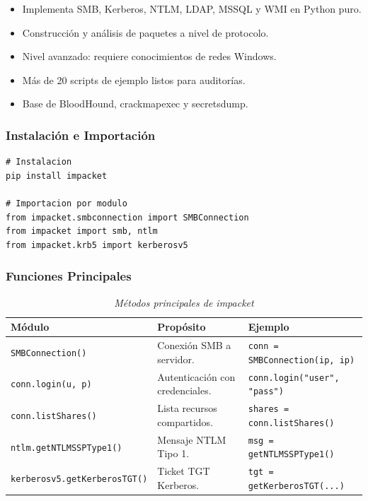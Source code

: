\documentclass[12pt,a4paper]{article}
\begin{document}
\begin{itemize}
\item Implementa SMB, Kerberos, NTLM, LDAP, MSSQL y WMI en Python puro.
\item Construcción y análisis de paquetes a nivel de protocolo.
\item Nivel avanzado: requiere conocimientos de redes Windows.
\item Más de 20 scripts de ejemplo listos para auditorías.
\item Base de BloodHound, crackmapexec y secretsdump.
\end{itemize}

\subsubsection{Instalación e Importación}

\begin{lstlisting}[caption={Instalación e importación modular de impacket},
                   label=lst:impacket_install]
# Instalacion
pip install impacket

# Importacion por modulo
from impacket.smbconnection import SMBConnection
from impacket import smb, ntlm
from impacket.krb5 import kerberosv5
\end{lstlisting}

\subsubsection{Funciones Principales}

\begin{table}[H]
\centering
\begin{threeparttable}
\caption{\textit{Métodos principales de impacket}}
\begin{tabular}{p{3.5cm}p{5cm}p{4.5cm}}
\toprule
\textbf{Módulo} & \textbf{Propósito} & \textbf{Ejemplo} \\
\midrule
\texttt{SMBConnection()} & Conexión SMB a servidor. & \texttt{conn = SMBConnection(ip, ip)} \\
\texttt{conn.login(u, p)} & Autenticación con credenciales. & \texttt{conn.login("user", "pass")} \\
\texttt{conn.listShares()} & Lista recursos compartidos. & \texttt{shares = conn.listShares()} \\
\texttt{ntlm.getNTLMSSPType1()} & Mensaje NTLM Tipo 1. & \texttt{msg = getNTLMSSPType1()} \\
\texttt{kerberosv5.getKerberosTGT()} & Ticket TGT Kerberos. & \texttt{tgt = getKerberosTGT(...)} \\
\bottomrule
\end{tabular}
\end{threeparttable}
\end{table}
\end{document}
